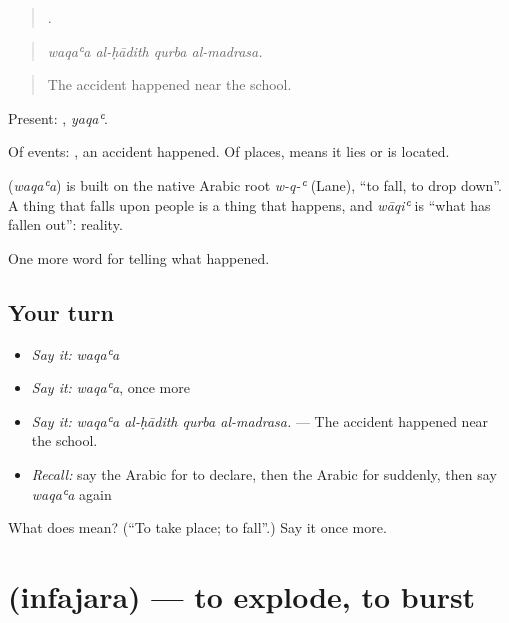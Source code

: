 \begin{quote}
   .
\end{quote}

\begin{quote}
\emph{waqaʿa al-ḥādith qurba al-madrasa.}
\end{quote}

\begin{quote}
The accident happened near the school.
\end{quote}

Present: , \emph{yaqaʿ}.

Of events:  , an accident happened. Of places,  means it lies or is located.

\begin{cousinweb}
\textbf{} (\emph{waqaʿa}) is built on the native Arabic root \emph{w-q-ʿ} (Lane), \textquotedblleft{}to fall, to drop down\textquotedblright{}. A thing that falls upon people is a thing that happens, and \emph{wāqiʿ} is \textquotedblleft{}what has fallen out\textquotedblright{}: reality.
\end{cousinweb}

\begin{grammarlens}[title={What you've built}]
One more word for telling what happened.
\end{grammarlens}

\subsection*{Your turn}
\begin{itemize}
\raggedright
  \item \emph{Say it:} \emph{waqaʿa}
  \item \emph{Say it:} \emph{waqaʿa}, once more
  \item \emph{Say it:} \emph{waqaʿa al-ḥādith qurba al-madrasa.} — The accident happened near the school.
  \item \emph{Recall:} say the Arabic for to declare, then the Arabic for suddenly, then say \emph{waqaʿa} again
\end{itemize}

\begin{tcolorbox}[breakable,colback=teal!4,colframe=teal!35!black,title={Before you move on}]
What does  mean? (\textquotedblleft{}To take place; to fall\textquotedblright{}.) Say it once more.
\end{tcolorbox}
\section[\texorpdfstring{\ar{انفجر} (infajara)}{انفجر (infajara)}]{ (infajara) — to explode, to burst}

